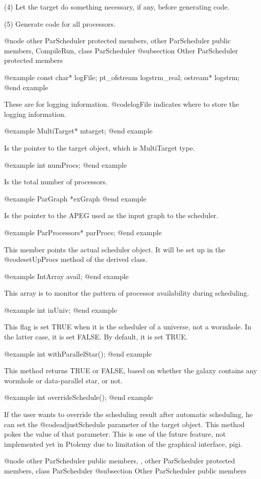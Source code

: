 (4) Let the target do something necessary, if any, before generating code.

(5) Generate code for all processors.

@node other ParScheduler protected members, other ParScheduler public members, CompileRun, class ParScheduler
@subsection Other ParScheduler protected members

@example
const char* logFile;
pt_ofstream logstrm_real;
ostream* logstrm;
@end example

These are for logging information. @code{logFile} indicates where to store
the logging information.

@example
MultiTarget* mtarget;
@end example

Is the pointer to the target object, which is MultiTarget type.

@example
int numProcs;
@end example

Is the total number of processors.

@example
ParGraph *exGraph
@end example

Is the pointer to the APEG used as the input graph to the scheduler.

@example
ParProcessors* parProcs;
@end example

This member points the actual scheduler object. It will be set up in the
@code{setUpProcs} method of the derived class.

@example
IntArray avail;
@end example

This array is to monitor the pattern of processor availability 
during scheduling.

@example
int inUniv;
@end example

This flag is set TRUE when it is the scheduler of a universe, not a wormhole.
In the latter case, it is set FALSE. By default, it is set TRUE.

@example 
int withParallelStar();
@end example

This method returns TRUE or FALSE, based on whether the galaxy contains 
any wormhole or data-parallel star, or not.

@example
int overrideSchedule();
@end example

If the user wants to override the scheduling result after automatic
scheduling, he can set the @code{adjustSchedule} parameter of the target
object. This method pokes the value of that parameter. This is one of
the future feature, not implemented yet in Ptolemy due to limitation of
the graphical interface, pigi.

@node other ParScheduler public members, , other ParScheduler protected members, class ParScheduler
@subsection Other ParScheduler public members

